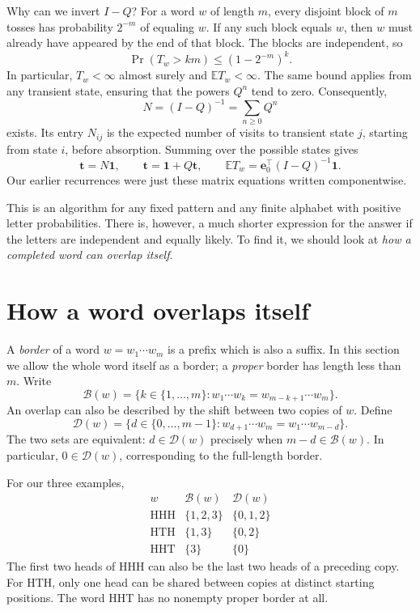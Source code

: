 Why can we invert \(I-Q\)? For a word \(w\) of length \(m\), every disjoint block of \(m\) tosses has probability \(2^{-m}\) of equaling \(w\). If any such block equals \(w\), then \(w\) must already have appeared by the end of that block. The blocks are independent, so
\begin{equation}
 \Pr(T_w>km)\leq(1-2^{-m})^k.
 \label{eq:N20261107-geometric-bound}
\end{equation}
In particular, \(T_w<\infty\) almost surely and \(\mathbb ET_w<\infty\). The same bound applies from any transient state, ensuring that the powers \(Q^n\) tend to zero. Consequently,
\[
 N=(I-Q)^{-1}=\sum_{n\geq0}Q^n
\]
exists. Its entry \(N_{ij}\) is the expected number of visits to transient state \(j\), starting from state \(i\), before absorption. Summing over the possible states gives
\begin{equation}
 \mathbf t=N\mathbf1,
 \qquad
 \mathbf t=\mathbf1+Q\mathbf t,
 \qquad
 \mathbb ET_w=\mathbf e_0^\top(I-Q)^{-1}\mathbf1.
 \label{eq:N20261107-fundamental}
\end{equation}
Our earlier recurrences were just these matrix equations written componentwise.

This is an algorithm for any fixed pattern and any finite alphabet with positive letter probabilities. There is, however, a much shorter expression for the answer if the letters are independent and equally likely. To find it, we should look at \emph{how a completed word can overlap itself}.

\section{How a word overlaps itself}

A \emph{border} of a word \(w=w_1\cdots w_m\) is a prefix which is also a suffix. In this section we allow the whole word itself as a border; a \emph{proper} border has length less than \(m\). Write
\[
 \mathcal B(w)=
 \{k\in\{1,\ldots,m\}:
    w_1\cdots w_k=w_{m-k+1}\cdots w_m\}.
\]
An overlap can also be described by the shift between two copies of \(w\). Define
\[
 \mathcal D(w)=
 \{d\in\{0,\ldots,m-1\}:
    w_{d+1}\cdots w_m=w_1\cdots w_{m-d}\}.
\]
The two sets are equivalent: \(d\in\mathcal D(w)\) precisely when \(m-d\in\mathcal B(w)\). In particular, \(0\in\mathcal D(w)\), corresponding to the full-length border.

For our three examples,
\[
\begin{array}{c|c|c}
 w&\mathcal B(w)&\mathcal D(w)\\\hline
 \mathrm{HHH}&\{1,2,3\}&\{0,1,2\}\\
 \mathrm{HTH}&\{1,3\}&\{0,2\}\\
 \mathrm{HHT}&\{3\}&\{0\}
\end{array}
\]
The first two heads of \(\mathrm{HHH}\) can also be the last two heads of a preceding copy. For \(\mathrm{HTH}\), only one head can be shared between copies at distinct starting positions. The word \(\mathrm{HHT}\) has no nonempty proper border at all.

